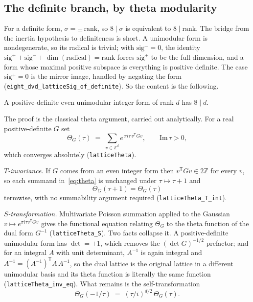 \subsection{The definite branch, by theta modularity}
\label{sec:sig-definite}

For a definite form, $\sigma = \pm\,\mathrm{rank}$, so $8\mid\sigma$ is
equivalent to $8\mid\mathrm{rank}$. The bridge from the inertia
hypothesis to definiteness is short. A unimodular form is nondegenerate,
so its radical is trivial; with $\mathrm{sig}^{-} = 0$, the identity
$\mathrm{sig}^{+} + \mathrm{sig}^{-} + \dim(\mathrm{radical}) =
\mathrm{rank}$ forces $\mathrm{sig}^{+}$ to be the full dimension, and a
form whose maximal positive subspace is everything is positive definite.
The case $\mathrm{sig}^{+} = 0$ is the mirror image, handled by negating
the form (\texttt{eight\_dvd\_latticeSig\_of\_definite}). So the content
is the following.

\begin{proposition}
\label{prop:theta}
A positive-definite even unimodular integer form of rank $d$ has
$8 \mid d$.
\end{proposition}

The proof is the classical theta argument, carried out analytically. For
a real positive-definite $G$ set
\begin{equation}
\Theta_G(\tau) \;=\; \sum_{v \in \mathbb{Z}^d}
e^{\,\pi i \tau\, v^{\mathsf T} G v},
\qquad \mathrm{Im}\,\tau > 0 ,
\label{eq:theta}
\end{equation}
which converges absolutely (\texttt{latticeTheta}).

\emph{$T$-invariance.} If $G$ comes from an even integer form then
$v^{\mathsf T} G v \in 2\mathbb{Z}$ for every $v$, so each summand
in~\eqref{eq:theta} is unchanged under $\tau \mapsto \tau + 1$ and
\begin{equation}
\Theta_G(\tau + 1) = \Theta_G(\tau)
\label{eq:theta-T}
\end{equation}
termwise, with no summability argument required
(\texttt{latticeTheta\_T\_int}).

\emph{$S$-transformation.} Multivariate Poisson summation applied to the
Gaussian $v \mapsto e^{\pi i \tau v^{\mathsf T} G v}$ gives the
functional equation relating $\Theta_G$ to the theta function of the dual
form $G^{-1}$ (\texttt{latticeTheta\_S}). Two facts collapse it. A
positive-definite unimodular form has $\det = +1$, which removes the
$(\det G)^{-1/2}$ prefactor; and for an integral $A$ with unit
determinant, $A^{-1}$ is again integral and
$A^{-1} = (A^{-1})^{\mathsf T} A\, A^{-1}$, so the dual lattice is the
original lattice in a different unimodular basis and its theta function is
literally the same function (\texttt{latticeTheta\_inv\_eq}). What remains
is the self-transformation
\begin{equation}
\Theta_G\!\left(-1/\tau\right)
\;=\; \left(\tau/i\right)^{d/2}\,\Theta_G(\tau).
\label{eq:theta-S}
\end{equation}

